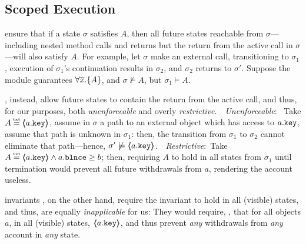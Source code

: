  
 \subsection{Scoped Execution}
 \label{sect:bounded}

  ensure that if a state $\sigma$ satisfies $A$, then all future states reachable from $\sigma$—including nested method calls and returns but   the return from the active call in $\sigma$—will also satisfy $A$. For example, let $\sigma$ make an external call, transitioning to $\sigma_1$,    execution of $\sigma_1$'s continuation results in $\sigma_2$, and $\sigma_2$ returns  to $\sigma'$. 
Suppose the module guarantees $\forall {\overline{x}}.{{\{}}{A}{{\}}}$, and $\sigma \not\models A$, but $\sigma_1 \models A$. 
 
%
 \cite{liskov94behavioral,usinghistory,Cohen10}, instead, allow future states to contain the return from the active call, and thus,   for our purposes,  both
 \emph{unenforceable} and overly \emph{restrictive}.\ \  \emph{Unenforceable}: \ Take $A \txteq \inside{a.\prg{key}}$,  assume  in $\sigma$ a path to an external object which has access to $a.\mbox{\normalfont{\texttt{key}}}$, assume that path is unknown in $\sigma_1$: then, the transition from $\sigma_1$ to $\sigma_2$ cannot eliminate that path—hence, $\sigma' \not\models \langle\!\!\langle a.\mbox{\normalfont{\texttt{key}}} \rangle\!\!\rangle$.\ \  \emph{Restrictive}:\ Take $A \txteq \inside{a.\prg{key}}\wedge a.\prg{blnce}\geq b$; then,  requiring  $A$   to hold in all states from $\sigma_1$ until termination would prevent all future withdrawals from $a$, rendering the account useless.

 invariants  \cite{Meyer92,MeyerDBC92,BarDelFahLeiSch04,objInvars,MuellerPoetzsch-HeffterLeavens06}, on the other hand, require the invariant to hold in all (visible) states, and thus,  are equally \emph{inapplicable} for us: They would require, \eg, that for all objects $a$, in all (visible) states, $\langle\!\!\langle a.\mbox{\normalfont{\texttt{key}}} \rangle\!\!\rangle$, and thus prevent \emph{any} withdrawals from \emph{any} account in \emph{any} state.

